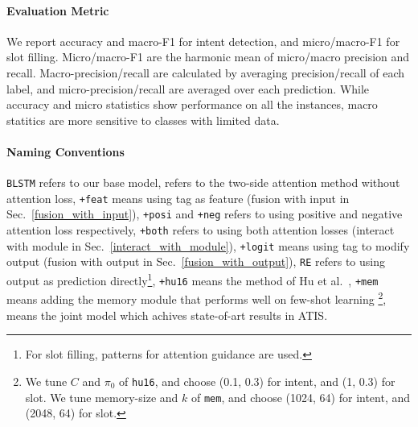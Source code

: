 \paragraph{Evaluation Metric}
We report accuracy and macro-F1 for intent detection, and micro/macro-F1 for slot filling.
Micro/macro-F1 are the harmonic mean of micro/macro precision and recall.
Macro-precision/recall are calculated by averaging precision/recall of each label, and micro-precision/recall are averaged over each prediction. 
While accuracy and micro statistics show performance on all the instances, macro statitics are more sensitive to classes with limited data.

\paragraph{Naming Conventions}
\texttt{BLSTM} refers to our base model,
\ptatt refers to the two-side attention method without attention loss,
\texttt{+feat} means using \RE tag as feature (fusion with input in Sec.~\ref{fusion_with_input}),
\texttt{+posi} and \texttt{+neg} refers to using positive and negative attention loss respectively, \texttt{+both} refers to using both attention losses (interact with \NN module in Sec.~\ref{interact_with_module}),
\texttt{+logit} means using \RE tag to modify \NN output (fusion with output in Sec.~\ref{fusion_with_output}),
\texttt{RE} refers to using \RE output as prediction directly\footnote{
For slot filling, patterns for attention guidance are used.}, 
\texttt{+hu16} means the method of Hu et al.~,
\texttt{+mem} means adding the memory module that performs well on few-shot learning \cite{kaiser2017learning}\footnote{
We tune $C$ and $\pi_0$ of \texttt{hu16}, and choose (0.1, 0.3) for intent, and (1, 0.3) for slot. We tune memory-size and $k$ of \texttt{mem}, and choose (1024, 64) for intent, and (2048, 64) for slot.
}, 
\LL means the joint model \cite{liu2016attention} which achives state-of-art results in ATIS. 



